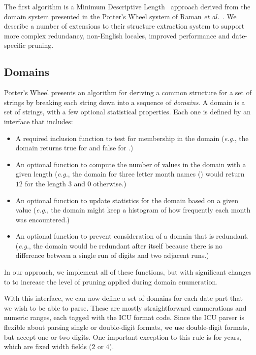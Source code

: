 The first algorithm is a Minimum Descriptive Length~\cite{Rissanen:1978} approach derived from the domain system presented in the Potter's Wheel system of Raman \textit{et al.}~\cite{Raman:2001}. We describe a number of extensions to their structure extraction system to support more complex redundancy, non-English locales, improved performance and date-specific pruning.

\subsection{Domains}
Potter's Wheel presents an algorithm for deriving a common structure for a set of strings by breaking each string down into a sequence of \textit{domains}. A domain is a set of strings, with a few optional statistical properties. Each one is defined by an interface that includes:
\begin{itemize}
\setlength\itemsep{0em}
\item A required inclusion function  to test for membership in the domain
(\textit{e.g.}, the domain  returns true for  
and false for .)
\item An optional function  to compute the number of values in the domain with a given length
(\textit{e.g.}, the domain for three letter month names () would return $12$ for the length $3$ and $0$ otherwise.)
\item An optional function  to update statistics for the domain based on a given value
(\textit{e.g.}, the domain  might keep a histogram of how frequently each month was encountered.)
\item An optional function  to prevent consideration of a domain that is redundant.
(\textit{e.g.},  the domain  would be redundant after itself because there is no difference between a single run of digits and two adjacent runs.)
\end{itemize}

In our approach, we implement all of these functions, but with significant changes to  to increase the level of pruning applied during
domain enumeration.

With this interface, we can now define a set of domains for each date part that we wish to be able to parse. These are mostly straightforward enumerations and numeric ranges, each tagged with the ICU format code. Since the ICU parser is flexible about parsing single or double-digit formats, we use double-digit formats, but accept one or two digits. One important exception to this rule is for years, which are fixed width fields ($2$ or $4$).

